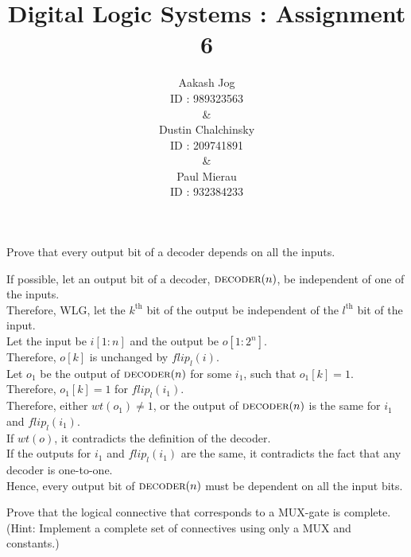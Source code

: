 \documentclass[fleqn, a4paper, 11pt, oneside]{amsart}
\title{Digital Logic Systems : Assignment 6}
\author{
	Aakash Jog\\
	ID : 989323563\\
	\&\\
	Dustin Chalchinsky\\
	ID : 209741891\\
	\&\\
	Paul Mierau\\
	ID : 932384233
	}
\date{\formatdate{26}{5}{2015}}
\theoremstyle{definition}
\theoremstyle{theorem}
\theoremstyle{remark}
\begin{document}
	
\maketitle

\begin{question}
	Prove that every output bit of a decoder depends on all the inputs.
\end{question}

\begin{solution}
	If possible, let an output bit of a decoder, $\textsc{decoder}(n)$, be independent of one of the inputs.\\
	Therefore, WLG, let the $k^{\text{th}}$ bit of the output be independent of the $l^{\text{th}}$ bit of the input.\\
	Let the input be $i[1:n]$ and the output be $o[1:2^n]$.\\
	Therefore, $o[k]$ is unchanged by $flip_{l}(i)$.\\
	Let $o_1$ be the output of $\textsc{decoder}(n)$ for some $i_1$, such that $o_1[k] = 1$.\\
	Therefore, $o_1[k] = 1$ for $flip_l(i_1)$.\\
	Therefore, either $wt(o_1) \neq 1$, or the output of $\textsc{decoder}(n)$ is the same for $i_1$ and $flip_l(i_1)$.\\
	If $wt(o)$, it contradicts the definition of the decoder.\\
	If the outputs for $i_1$ and $flip_l(i_1)$ are the same, it contradicts the fact that any decoder is one-to-one.\\
	Hence, every output bit of $\textsc{decoder}(n)$ must be dependent on all the input bits.
\end{solution}

\begin{question}
	Prove that the logical connective that corresponds to a MUX-gate is complete.
	(Hint: Implement a complete set of connectives using only a MUX and constants.)
\end{question}
\end{document}
